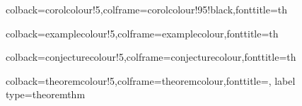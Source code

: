 %
{colback=corolcolour!5,colframe=corolcolour!95!black,fonttitle=\bfseries}{th}

%
{colback=examplecolour!5,colframe=examplecolour,{fonttitle=\bfseries \color{black}}}{th}



%
{colback=conjecturecolour!5,colframe=conjecturecolour,{fonttitle=\bfseries \color{black}}}{th}


%
{colback=theoremcolour!5,colframe=theoremcolour,{fonttitle=\bfseries \color{black}},
label type=theorem}{thm}





%
%
%
%
%
%
%
%
%
%
%
%
%



